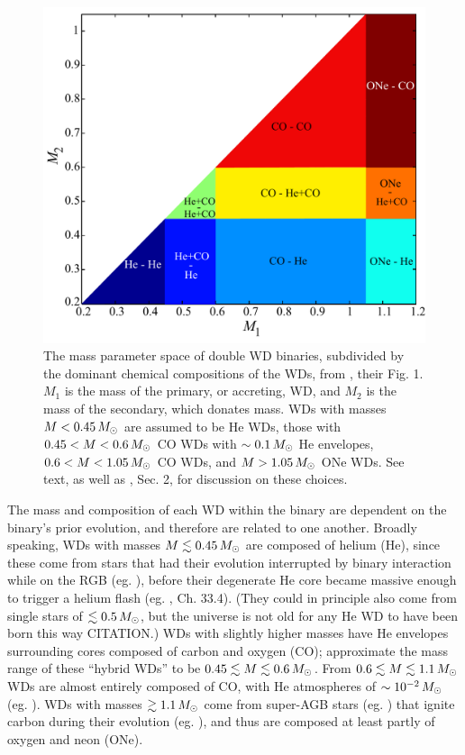 
\begin{figure}
\centering
\includegraphics[width=0.6\hsize]{introduction/figures/dan+12_wdbinmass.pdf}
\caption{The mass parameter space of double WD binaries, subdivided by the dominant chemical compositions of the WDs, from \cite{dan+12}, their Fig. 1.  $M_1$ is the mass of the primary, or accreting, WD, and $M_2$ is the mass of the secondary, which donates mass.  WDs with masses $M<0.45\,\Msun$ are assumed to be He WDs, those with $0.45 < M < 0.6\,\Msun$ CO WDs with $\sim0.1\,\Msun$ He envelopes, $0.6 < M < 1.05\,\Msun$ CO WDs, and $M>1.05\,\Msun$ ONe WDs.  See text, as well as \cite{dan+12}, Sec. 2, for discussion on these choices.}
\label{fig:c1_wdbinarymasses}
\end{figure}

The mass and composition of each WD within the binary are dependent on the binary's prior evolution, and therefore are related to one another.  Broadly speaking, WDs with masses $M \lesssim 0.45\,\Msun$ are composed of helium (He), since these come from stars that had their evolution interrupted by binary interaction while on the RGB (eg. \citealt{marsdd95, nele+01, nele+01a}), before their degenerate He core became massive enough to trigger a helium flash (eg. \cite{kippww12}, Ch. 33.4).  (They could in principle also come from single stars of $\lesssim0.5\,\Msun$, but the universe is not old for any He WD to have been born this way {\charles CITATION}.)  WDs with slightly higher masses have He envelopes surrounding cores composed of carbon and oxygen (CO); \cite{dan+12} approximate the mass range of these ``hybrid WDs'' to be $0.45 \lesssim M \lesssim 0.6\,\Msun$.  From $0.6 \lesssim M \lesssim 1.1\,\Msun$ WDs are almost entirely composed of CO, with He atmospheres of $\sim10^{-2}\,\Msun$ (eg. \citealt{ibent85}).  WDs with masses $\gtrsim 1.1\,\Msun$ come from super-AGB stars (eg. \citealt{herw05}) that ignite carbon during their evolution (eg. \citealt{garc13}), and thus are composed at least partly of oxygen and neon (ONe).  

